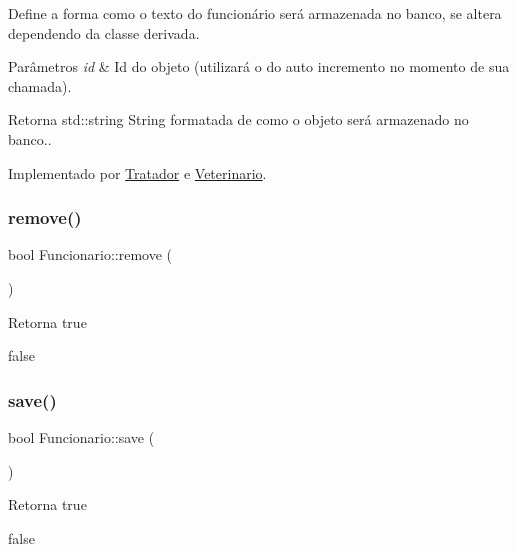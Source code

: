 Define a forma como o texto do funcionário será armazenada no banco, se altera dependendo da classe derivada. 


\begin{DoxyParams}{Parâmetros}
{\em id} & Id do objeto (utilizará o do auto incremento no momento de sua chamada). \\
\hline
\end{DoxyParams}
\begin{DoxyReturn}{Retorna}
std\+::string String formatada de como o objeto será armazenado no banco.. 
\end{DoxyReturn}


Implementado por \hyperlink{classTratador_af2efc58696c20320f51741d01a958ef7}{Tratador} e \hyperlink{classVeterinario_a9c922980caf0113e0e9048ea3528e88d}{Veterinario}.

\mbox{\label{classFuncionario_a0ea198bfb72865e5e0bf913c62020275}} 
\subsubsection{\texorpdfstring{remove()}{remove()}}
{\footnotesize\ttfamily bool Funcionario\+::remove (\begin{DoxyParamCaption}{ }\end{DoxyParamCaption})}

\begin{DoxyReturn}{Retorna}
true 

false 
\end{DoxyReturn}
\mbox{\label{classFuncionario_acb246ecc22f9135f2adad51a131ea45c}} 
\subsubsection{\texorpdfstring{save()}{save()}}
{\footnotesize\ttfamily bool Funcionario\+::save (\begin{DoxyParamCaption}{ }\end{DoxyParamCaption})}

\begin{DoxyReturn}{Retorna}
true 

false 
\end{DoxyReturn}
\mbox{\label{classFuncionario_a4fd103578189cdce84cd0f76f6c668fd}} 

